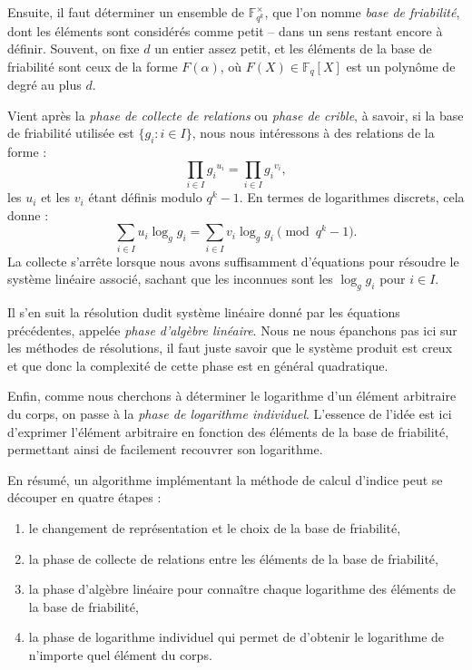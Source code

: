 \documentclass[a4paper, titlepage, 11pt]{article}
\theoremstyle{definition}
\theoremstyle{remark}
\def\gf #1{\mathbb{F}_{#1}}
\begin{document}
Ensuite, il faut déterminer un ensemble de $\gf{q^k}^\times$, que l'on nomme \textit{base de friabilité}, dont les éléments sont considérés comme petit -- dans un sens restant encore à définir. Souvent, on fixe $d$ un entier assez petit, et les éléments de la base de friabilité sont ceux de la forme $F(\alpha)$, où $F(X)\in\gf{q}[X]$ est un polynôme de degré au plus $d$.

Vient après la \textit{phase de collecte de relations} ou \textit{phase de crible}, à savoir, si la base de friabilité utilisée est $\{g_i : i \in I\}$, nous nous intéressons à des relations de la forme :
$$\prod_{i\in I} {g_i}^{u_i} = \prod_{i\in I} {g_i}^{v_i},$$
les $u_i$ et les $v_i$ étant définis modulo $q^k-1$. En termes de logarithmes discrets, cela donne :
$$\sum_{i\in I} u_i \log_gg_i = \sum_{i\in I} v_i \log_gg_i \pmod{q^k-1}.$$
La collecte s’arrête lorsque nous avons suffisamment d'équations pour résoudre le système linéaire associé, sachant que les inconnues sont les $\log_gg_i$ pour  $i\in I$.

Il s'en suit la résolution dudit système linéaire donné par les équations précédentes, appelée \textit{phase d'algèbre linéaire}. Nous ne nous épanchons pas ici sur les méthodes de résolutions, il faut juste savoir que le système produit est creux et que donc la complexité de cette phase est en général quadratique.

Enfin, comme nous cherchons à déterminer le logarithme d'un élément arbitraire du corps, on passe à la \textit{phase de logarithme individuel}. L'essence de l'idée est ici d'exprimer l'élément arbitraire en fonction des éléments de la base de friabilité, permettant ainsi de facilement recouvrer son logarithme.

En résumé, un algorithme implémentant la méthode de calcul d'indice peut se découper en quatre étapes : \begin{enumerate}
\item le changement de représentation et le choix de la base de friabilité,
\item la phase de collecte de relations entre les éléments de la base de friabilité,
\item la phase d'algèbre linéaire pour connaître chaque logarithme des éléments de la base de friabilité,
\item la phase de logarithme individuel qui permet de d'obtenir le logarithme de n’importe quel élément du corps.
\end{enumerate}
\end{document}
